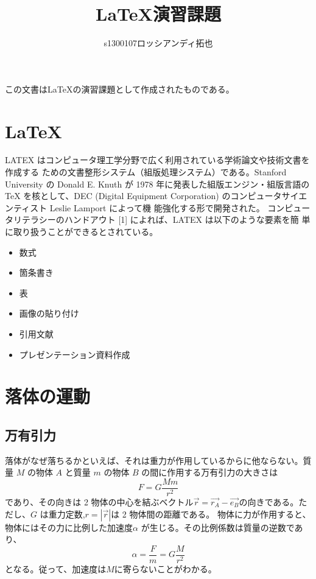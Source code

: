\documentclass[platex,a4paper,12pt,dvipdfmx]{jsarticle}
\title{{\LaTeX}演習課題}
\author{s1300107ロッシアンディ拓也}
\begin{document}
\maketitle
この文書は{\LaTeX}の演習課題として作成されたものである。

\section{\LaTeX}
LATEX はコンピュータ理工学分野で広く利用されている学術論文や技術文書を作成する
ための文書整形システム（組版処理システム）である。Stanford University の Donald E.
Knuth が 1978 年に発表した組版エンジン・組版言語の TeX を核として、DEC (Digital
Equipment Corporation) のコンピュータサイエンティスト Leslie Lamport によって機
能強化する形で開発された。
コンピュータリテラシーのハンドアウト [1] によれば、LATEX は以下のような要素を簡
単に取り扱うことができるとされている。
\begin{itemize}
\item 数式
\item 箇条書き
\item 表
\item 画像の貼り付け
\item 引用文献
\item プレゼンテーション資料作成
\end{itemize}
\section{落体の運動}
\subsection{万有引力}
落体がなぜ落ちるかといえば、それは重力が作用しているからに他ならない。質量 $M$
の物体 $A$ と質量 $m$ の物体 $B$ の間に作用する万有引力の大きさは
\[F = G\frac{Mm}{r^2} \]
であり、その向きは 2 物体の中心を結ぶベクトル$\vec{r} = \vec{r_A} - \vec{e_B}$の向きである。ただし、$G$
は重力定数,$r = |\vec {r}|$は 2 物体間の距離である。
物体に力が作用すると、物体にはその力に比例した加速度$\alpha$ が生じる。その比例係数は質量の逆数であり、\begin{equation}\alpha = \frac{F}{m} = G\frac{M}{r^2} \end{equation} となる。従って、加速度は$M$に寄らないことがわかる。
\end{document}
